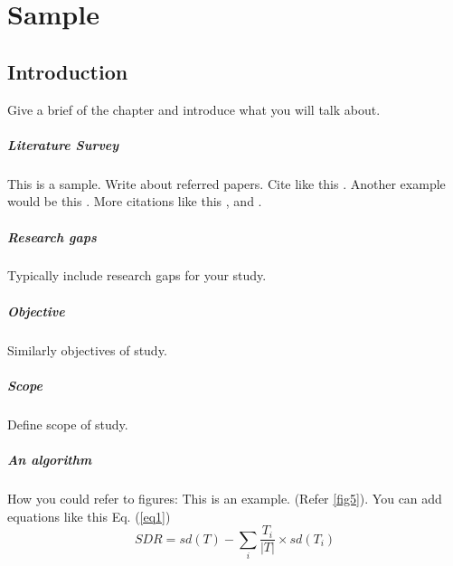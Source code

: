 
\chapter{Sample} %

\label{Chapter 1} %


\section{Introduction}



Give a brief of the chapter and introduce what you will talk about. 


\paragraph{Literature Survey}

This is a sample. Write about referred papers. Cite like this \citep{nip2010cyclic}. Another example would be this \citep{nip2010extremely}. More citations like this \citep{bird2004evaluating}, \citep {tremblay2003seismic} and \citep {alhamaydeh2016key}.

\paragraph{Research gaps}
Typically include research gaps for your study. 
\paragraph{Objective}
Similarly objectives of study. 
\paragraph{Scope}
Define scope of study. 
\paragraph{An algorithm}
How you could refer to figures: This is an example. (Refer \ref{fig5}). You can add equations like this Eq. (\ref{eq1})
\begin{equation}
\label{eq1}
  SDR = sd(T) - \sum_{i}\frac{{T}_{i}}{|T|}\times sd({T}_{i})
\end{equation}

